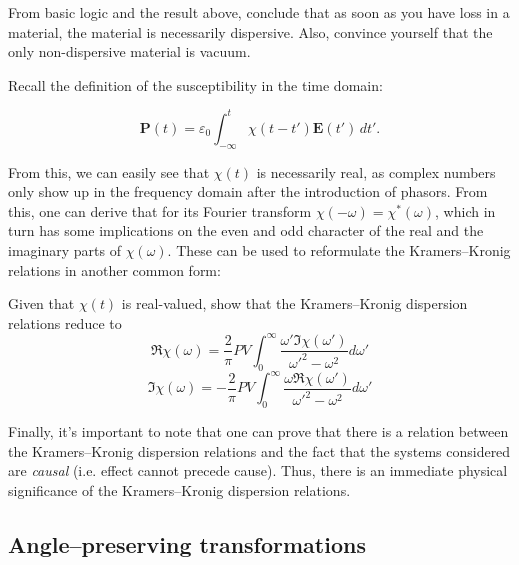 \begin{exer}
From basic logic and the result above, conclude that as soon as you have loss in a material, the material is necessarily dispersive. Also, convince yourself that the only non-dispersive material is vacuum.
\end{exer}

Recall the definition of the susceptibility in the time domain:

\begin{equation}
\mathbf{P}(t)=\varepsilon_0 \int_{-\infty}^t \chi(t-t') \mathbf{E}(t')\, dt'.
\end{equation}

From this, we can easily see that $\chi(t)$ is necessarily real, as complex numbers only show up in the frequency domain after the introduction of phasors. From this, one can derive that for its Fourier transform $\chi(-\omega) = \chi^*(\omega)$, which in turn has some implications on the even and odd character of the real and the imaginary parts of $\chi(\omega)$. These can be used to reformulate the Kramers--Kronig relations in another common form:

\begin{exer}
Given that $\chi(t)$ is real-valued, show that the Kramers--Kronig dispersion relations reduce to
$$\Re \chi(\omega) =  \frac{2}{\pi} PV \int_{0}^{\infty}{ \frac{\omega'\Im \chi(\omega')}{\omega'^2-\omega^2}d\omega'}$$
$$\Im \chi(\omega) = -\frac{2}{\pi} PV \int_{0}^{\infty}{ \frac{\omega \Re \chi(\omega')}{\omega'^2-\omega^2}d\omega'}$$
\end{exer}

Finally, it's important to note that one can prove that there is a relation between the Kramers--Kronig dispersion relations and the fact that the systems considered are \emph{causal} (i.e. effect cannot precede cause)\noindent{}. Thus, there is an immediate physical significance of the Kramers--Kronig dispersion relations.


\pagebreak


\label{week3}

\subsection*{Angle--preserving transformations}

